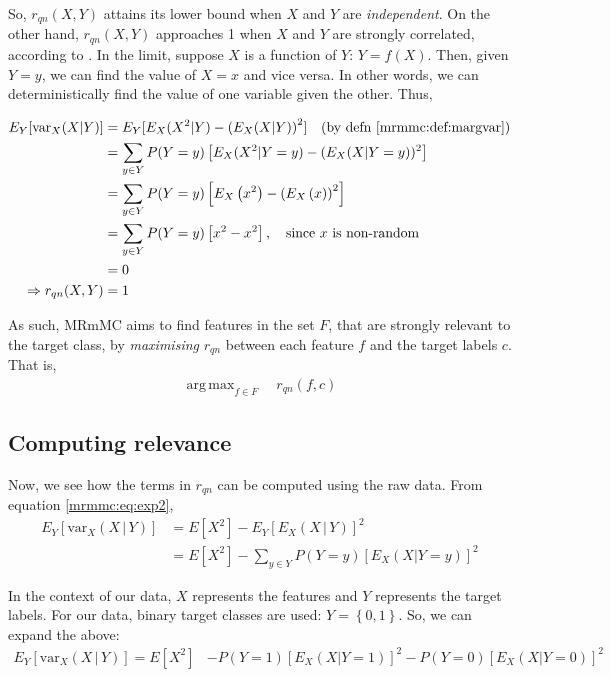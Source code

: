 \documentclass[12pt, twoside, a4paper]{report}
\def\var{\text{var}}
\DeclareMathOperator*{\argmax}{arg\,max}
\begin{document}
So, $r_{qn}(X, Y)$ attains its lower bound when $X$ and $Y$ are \textit{independent}. On the other hand, $r_{qn}(X, Y)$ approaches 1 when $X$ and $Y$ are strongly correlated, according to \cite{RefWorks:187}. In the limit, suppose $X$ is a function of $Y$: $Y=f(X)$. Then, given $Y=y$, we can find the value of $X=x$ and vice versa. In other words, we can deterministically find the value of one variable given the other. Thus,

\begin{align*}
E_Y[\var_X(X|Y)]
&= E_Y [E_X(X^2|Y)-\left( E_X(X|Y) \right)^2 ] \quad \text{(by defn \ref{mrmmc:def:margvar})} \\
&= \sum_{y \in Y} P(Y=y) \left[ E_X(X^2|Y=y)- ( E_X(X|Y=y))^2 \right] \\
&= \sum_{y \in Y} P(Y=y) \left[E_X\left(x^2\right)-\left( E_X\left(x \right) \right)^2 \right] \\
&= \sum_{y \in Y} P(Y=y)  \left[x^2 -x^2 \right] , \quad \text{since $x$ is non-random} \\
&= 0 \\
\Rightarrow r_{qn} (X, Y) &= 1
\end{align*}

As such, MRmMC aims to find features in the set $F$, that are strongly relevant to the target class, by \textit{maximising} $r_{qn}$ between each feature $f$ and the target labels $c$. That is,
\begin{align*}
\argmax_{f \in F} \quad r_{qn}(f, c)
\end{align*}

\subsection{Computing relevance}
Now, we see how the terms in $r_{qn}$ can be computed using the raw data. From equation \ref{mrmmc:eq:exp2},
\begin{align*}
E_Y [ \var_X(X \, | \, Y) ]
&= E[X^2] - E_Y [ E_X(X\,|\,Y) ] ^2 \\
&= E[X^2] - \sum_{y \in Y} P(Y=y) \left[ E_X(X|Y=y) \right]^2 
\end{align*}

In the context of our data, $X$ represents the features and $Y$ represents the target labels. For our data, binary target classes are used: $Y= \left\lbrace 0,1 \right\rbrace$. So, we can expand the above:
\begin{align*}
E_Y [ \var_X(X \, | \, Y) ]
= E[X^2] &- P(Y=1) \left[ E_X(X|Y=1) \right]^2 - P(Y=0) \left[ E_X(X|Y=0) \right]^2 
\end{align*}
\end{document}
